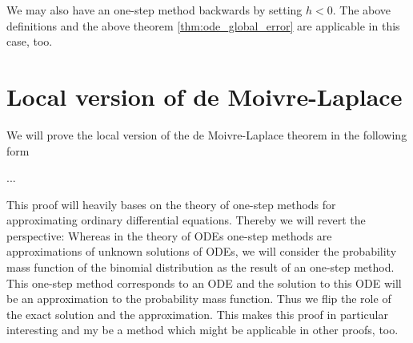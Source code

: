 We may also have an one-step method backwards by setting $h < 0$. The above definitions and the  above theorem \ref{thm:ode_global_error} are applicable in this case, too.

\section{Local version of de Moivre-Laplace}

We will prove the local version of the de Moivre-Laplace theorem in the following form

\begin{theorem}
  ...
\end{theorem}

This proof will heavily bases on the theory of one-step methods for approximating ordinary differential equations. Thereby we will revert the perspective: Whereas in the theory of ODEs one-step methods are approximations of unknown solutions of ODEs, we will consider the probability mass function of the binomial distribution as the result of an one-step method. This one-step method corresponds to an ODE and the solution to this ODE will be an approximation to the probability mass function. Thus we flip the role of the exact solution and the approximation. This makes this proof in particular interesting and my be a method which might be applicable in other proofs, too.

\newcommand*{\knp}{m}
\newcommand*{\xnp}{\x[\knp]}
\newcommand*{\phin}[2][n]{y_{#1}\left({#2}\right)}
\newcommand*{\dphin}[2][n]{y_{#1}'\left({#2}\right)}

